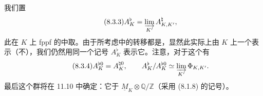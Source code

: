 我们置
\begin{equation}\tag{8.3.3}
 A_K^\flat=\varinjlim_{K'}A_{K,K'}^\natural,
\end{equation}
此在 $K$ 上 fppf 的中取。由于所考虑中的转移都是，显然此实际上由 $K$ 上一个表示（不），我们仍然用同一个记号 $A_K^\flat$ 表示它。注意，对于这个有
\begin{equation}\tag{8.3.4}
 A_K^{\flat0}=A_K^{\natural0},\qquad
 A_K^\flat/A_K^{\flat0}\simeq\varinjlim_{K'}\Phi_{K,K'}.
\end{equation}
最后这个群将在 11.10 中确定：它于 $\underline M_K\otimes\mathbb Q/\mathbb Z$（采用 (8.1.8) 的记号）。
